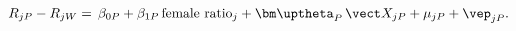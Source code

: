 \begin{equation}\label{equation3}
	R_{jP}-R_{jW}=\,\beta_{0P}+\beta_{1P}\,\text{female ratio}_j+\bm\uptheta_P\,\vect X_{jP}+\mu_{jP}+\vep_{jP}.
\end{equation}